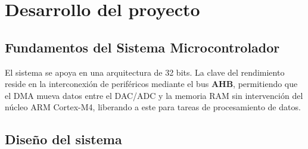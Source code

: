 \documentclass[11pt,a4paper]{article}
\begin{document}
\section{Desarrollo del proyecto}

\subsection{Fundamentos del Sistema Microcontrolador}
El sistema se apoya en una arquitectura de 32 bits. La clave del rendimiento reside en la interconexión de periféricos mediante el bus \textbf{AHB}, permitiendo que el DMA mueva datos entre el DAC/ADC y la memoria RAM sin intervención del núcleo ARM Cortex-M4, liberando a este para tareas de procesamiento de datos.

\subsection{Diseño del sistema}

\end{document}
